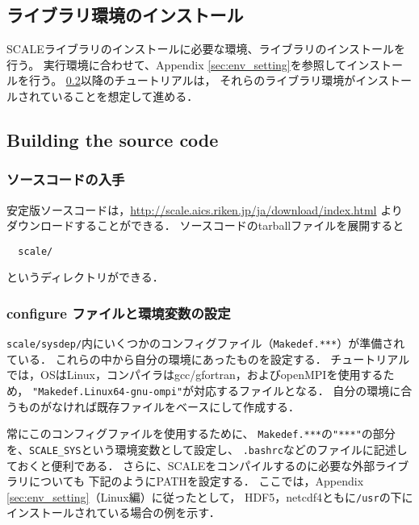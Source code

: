 \subsection{ライブラリ環境のインストール}
SCALEライブラリのインストールに必要な環境、ライブラリのインストールを行う。
実行環境に合わせて、Appendix \ref{sec:env_setting}を参照してインストールを行う。
\ref{sec:source_code}以降のチュートリアルは，
それらのライブラリ環境がインストールされていることを想定して進める．



\subsection{Building the source code} \label{sec:source_code}

\subsubsection{ソースコードの入手}

安定版ソースコードは，\url{http://scale.aics.riken.jp/ja/download/index.html}
よりダウンロードすることができる．
ソースコードのtarballファイルを展開すると
\begin{verbatim}
  scale/
\end{verbatim}
というディレクトリができる．


\subsubsection{configure ファイルと環境変数の設定}

\verb|scale/sysdep/|内にいくつかのコンフィグファイル（\verb|Makedef.***|）が準備されている．
これらの中から自分の環境にあったものを設定する．
チュートリアルでは，OSはLinux，コンパイラはgcc/gfortran，およびopenMPIを使用するため，
\verb|"Makedef.Linux64-gnu-ompi"|が対応するファイルとなる．
自分の環境に合うものがなければ既存ファイルをベースにして作成する．

常にこのコンフィグファイルを使用するために、
\verb|Makedef.***|の\verb|"***"|の部分を、\verb|SCALE_SYS|という環境変数として設定し、
\verb|.bashrc|などのファイルに記述しておくと便利である．
さらに、SCALEをコンパイルするのに必要な外部ライブラリについても
下記のようにPATHを設定する．
ここでは，Appendix \ref{sec:env_setting}（Linux編）に従ったとして，
HDF5，netcdf4ともに\verb|/usr|の下にインストールされている場合の例を示す．


